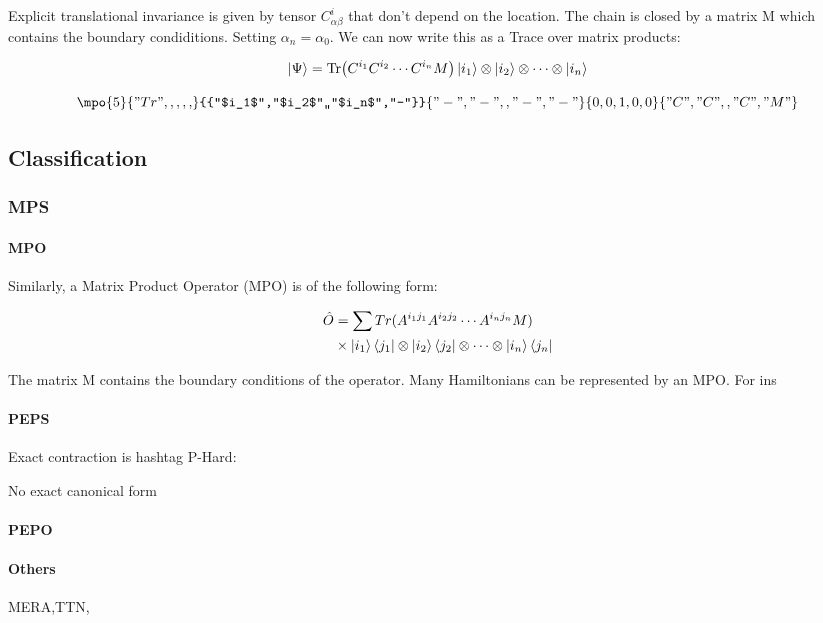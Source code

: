 Explicit translational invariance is given by tensor $C^i_{\alpha \beta }$ that don't depend on the location. The chain is closed by a matrix M which contains the boundary condiditions. Setting $\alpha_n = \alpha_0$. We can now write this as a Trace over matrix products:

\begin{equation}
    \ket{\Psi} = \Tr( C^{i_1} C^{i_2} \cdots C^{i_n} M  ) \ket{i_1} \otimes \ket{i_2} \otimes \cdots \otimes \ket{i_n}
\end{equation}

\begin{equation}
    \mpo{5}{{"Tr",,,,,}}{{"$i_1$","$i_2$",,"$i_n$","-"}}{{"-","-",,"-","-"}}{{0,0,1,0,0}}{{"C", "C",,"C","M" }}
\end{equation}

\subsection{Classification}

\subsubsection{MPS}

\paragraph{MPO}

Similarly, a Matrix Product Operator (MPO) is of the following form:

\begin{equation} \label{def_mpo}
    \begin{split}
        \hat{O} &= \sum Tr(A^{i_1 j_1} A^{i_2 j_2} \cdots A^{i_n j_n} M) \\
        & \times \ket{i_1}\bra{j_1} \otimes \ket{i_2}\bra{j_2} \otimes \cdots \otimes \ket{i_n}\bra{j_n}
    \end{split}
\end{equation}



The matrix M contains the boundary conditions of the operator. Many Hamiltonians can be represented by an MPO. For ins

\paragraph{PEPS}

Exact contraction is hashtag P-Hard:

No exact canonical form

\paragraph{PEPO}

\paragraph{Others}

MERA,TTN,